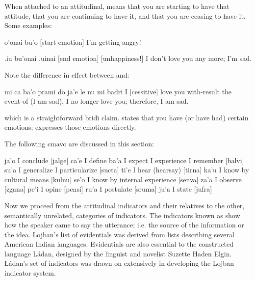 When attached to an attitudinal,  means that you are
    starting to have that attitude,  that you are
    continuing to have it, and  that you are ceasing to
    have it. Some examples:
\begin{example}
o'onai bu'o\n
{} [start emotion]\n
I'm getting angry!
\end{example}

\begin{example}
.iu bu'onai .uinai\n
{} [end emotion] [unhappiness!]\n
I don't love you any more; I'm sad.
\end{example}

Note the difference in effect between  and:
\begin{example}
mi ca ba'o prami do ja'e le nu\n
\T	mi badri\n
I  [cessitive] love you with-result the event-of\n
\T	(I am-sad).\n
I no longer love you; therefore, I am sad.
\end{example}

{\noindent}which is a straightforward bridi claim.  states that you have (or have
    had) certain emotions; 
    expresses those emotions directly.



The following cmavo are discussed in this section:

   ja'o    I conclude
            [jalge]
    ca'e    I define
    ba'a    I expect    I experience    I remember
            [balvi]
    su'a    I generalize            I particularize
            [sucta]
    ti'e    I hear (hearsay)
            [tirna]
    ka'u    I know by cultural means
            [kulnu]
    se'o    I know by internal experience
            [senva]
    za'a    I observe
            [zgana]
    pe'i    I opine [pensi]
    ru'a    I postulate
            [sruma]
    ju'a    I state [jufra]

Now we proceed from the attitudinal indicators and their
    relatives to the other, semantically unrelated, categories of
    indicators. The indicators known as  show how
    the speaker came to say the utterance; i.e. the source of the
    information or the idea. Lojban's list of evidentials was
    derived from lists describing several American Indian
    languages. Evidentials are also essential to the constructed
    language L\'{a}dan, designed by the linguist and novelist
    Suzette Haden Elgin. L\'{a}dan's set of indicators was
    drawn on extensively in developing the Lojban indicator system.

